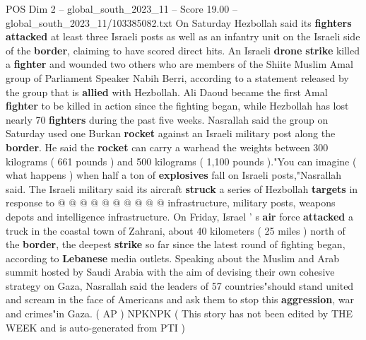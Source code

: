 \begin{textsample}{POS Dim 2 – global\_south\_2023\_11 – Score 19.00 – global\_south\_2023\_11/103385082.txt}
On Saturday Hezbollah said its \textbf{fighters} \textbf{attacked} at least three Israeli posts as well as an infantry unit on the Israeli side of the \textbf{border}, claiming to have scored direct hits.
An Israeli \textbf{drone} \textbf{strike} killed a \textbf{fighter} and wounded two others who are members of the Shiite Muslim Amal group of Parliament Speaker Nabih Berri, according to a statement released by the group that is \textbf{allied} with Hezbollah.
Ali Daoud became the first Amal \textbf{fighter} to be killed in action since the fighting began, while Hezbollah has lost nearly 70 \textbf{fighters} during the past five weeks.
Nasrallah said the group on Saturday used one Burkan \textbf{rocket} against an Israeli military post along the \textbf{border}.
He said the \textbf{rocket} can carry a warhead the weights between 300 kilograms ( 661 pounds ) and 500 kilograms ( 1,100 pounds )."You can imagine ( what happens ) when half a ton of \textbf{explosives} fall on Israeli posts,"Nasrallah said.
The Israeli military said its aircraft \textbf{struck} a series of Hezbollah \textbf{targets} in response to @ @ @ @ @ @ @ @ @ @ infrastructure, military posts, weapons depots and intelligence infrastructure.
On Friday, Israel ' s \textbf{air} force \textbf{attacked} a truck in the coastal town of Zahrani, about 40 kilometers ( 25 miles ) north of the \textbf{border}, the deepest \textbf{strike} so far since the latest round of fighting began, according to \textbf{Lebanese} media outlets.
Speaking about the Muslim and Arab summit hosted by Saudi Arabia with the aim of devising their own cohesive strategy on Gaza, Nasrallah said the leaders of 57 countries"should stand united and scream in the face of Americans and ask them to stop this \textbf{aggression}, war and crimes"in Gaza. ( AP ) NPKNPK ( This story has not been edited by THE WEEK and is auto-generated from PTI )

\end{textsample}
